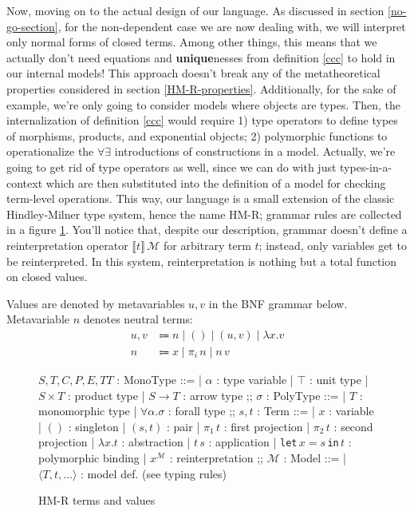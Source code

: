Now, moving on to the actual design of our language. As
discussed in section \ref{no-go-section}, for the
non-dependent case we are now dealing with, we will
interpret only normal forms of closed terms. Among other
things, this means that we actually don't need equations
and \textbf{unique}nesses from definition \ref{ccc} to
hold in our internal models! This approach doesn't break
any of the metatheoretical properties considered in
section \ref{HM-R-properties}. Additionally, for the
sake of example, we're only going to consider models
where objects are types. Then, the internalization of
definition \ref{ccc} would require 1) type operators to
define types of morphisms, products, and exponential
objects; 2) polymorphic functions to operationalize the
$\forall\exists$ introductions of constructions in a
model. Actually, we're going to get rid of type
operators as well, since we can do with just
types-in-a-context which are then substituted into
the definition of a model for checking term-level
operations. This way, our language is a small extension
of the classic Hindley-Milner type system, hence the name
HM-R; grammar rules are collected in a figure
\ref{hm-r-grammar}. You'll notice that, despite our
description, grammar doesn't define a reinterpretation
operator $\llbracket t\rrbracket\,\mathcal{M}$ for
arbitrary term $t$; instead, only variables get to be
reinterpreted. In this system, reinterpretation is
nothing but a total function on closed values.

\begin{definition}[Values of HM-R]
Values are denoted by metavariables $u,v$ in the BNF
grammar below. Metavariable $n$ denotes neutral terms:
\begin{align*}
    u,v&\Coloneqq n\;|\;()\;|\;(u,v)\;|\;\lambda x.v\\
    n&\Coloneqq x\;|\;\pi_i\,n\;|\;n\,v
\end{align*}
\end{definition}

\begin{figure}
\centering
\begin{bnf}
    $S,T,C,P,E,TT$ : \textsf{MonoType} ::=
    | $\alpha$ : type variable
    | $\top$ : unit type
    | $S\times T$ : product type
    | $S\to T$ : arrow type
    ;;
    $\sigma$ : \textsf{PolyType} ::=
    | $T$ : monomorphic type
    | $\forall\alpha.\sigma$ : forall type
    ;;
    $s,t$ : \textsf{Term} ::=
    | $x$ : variable
    | $()$ : singleton
    | $(s, t)$ : pair
    | $\pi_1\,t$ : first projection
    | $\pi_2\,t$ : second projection
    | $\lambda x. t$ : abstraction
    | $t\,s$ : application
    | \texttt{let}\,$x=s$\,\texttt{in}\,$t$
        : polymorphic binding
    | $x^\mathcal{M}$ : reinterpretation
    ;;
    $\mathcal{M}$ : \textsf{Model} ::=
    | $\langle T, t, \ldots \rangle$
        : model def. (see typing rules)
\end{bnf}
\caption{HM-R terms and values}
\Description{}
\label{hm-r-grammar}
\end{figure}

